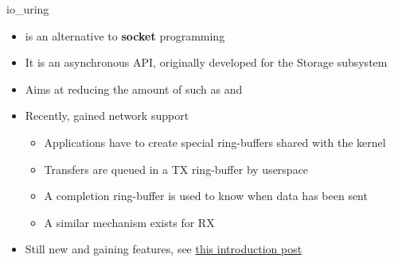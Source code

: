 \begin{frame}{io\_uring}
	\begin{itemize}
		\item {} is an alternative to \textbf{socket} programming
		\item It is an asynchronous API, originally developed for the Storage subsystem
		\item Aims at reducing the amount of  such as  and 
		\item Recently,  gained network support
			\begin{itemize}
				\item Applications have to create special ring-buffers shared with the kernel
				\item Transfers are queued in a TX ring-buffer by userspace
				\item A completion ring-buffer is used to know when data has been sent
				\item A similar mechanism exists for RX
			\end{itemize}
		\item Still new and gaining features, see \href{https://developers.redhat.com/articles/2023/04/12/why-you-should-use-iouring-network-io}{this introduction post}
	\end{itemize}
\end{frame}

